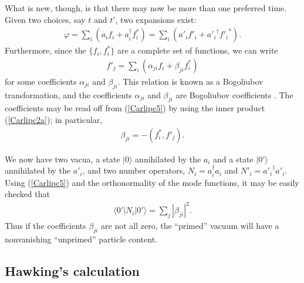\documentclass[11pt]{article}
\begin{document}
What is new, though, is that there may now be more than one preferred time.
Given two choices, say $t$ and $t'$, two expansions exist:
\begin{align}
\varphi = \sum_i \left(a_if_i + a_i^\dagger f_i^*\right)  
  = \sum_i\left(a'_if'_i + {a'_i}^\dagger {f'_i}^*\right)   .
\label{Carlipc4}
\end{align}
Furthermore, since the $\{f_i,f_i^*\}$ are a complete set of functions, we can
write
\begin{align}
f'_j 
  = \sum_i \left(\alpha_{ji}f_i + \beta_{ji}f_i^*\right) 
\label{Carlipc5}
\end{align}
for some coefficients $\alpha_{ji}$ and $\beta_{ji}$.
This relation is known as a Bogoliubov transformation, and 
the coefficients $\alpha_{ji}$ and $\beta_{ji}$ are Bogoliubov 
coefficients \cite{Bogoliubov}.   The coefficients may be
read off from (\ref{Carlipc5}) by using the inner product (\ref{Carlipc2a});
in particular,
\begin{align}
\beta_{ji} = -(f^*_i,f'_j)  .
\label{Carlipc5a}
\end{align}

We now have two vacua, a state $|0\rangle$ annihilated by the 
$a_i$ and a state $|0'\rangle$ annihilated by the $a'_i$, and
two number operators, $N_i=a_i^\dagger a_i$ 
and $N'_i={a'_i}^\dagger a'_i$.  Using (\ref{Carlipc5}) and the 
orthonormality of the mode functions, it may be easily checked that
\begin{align}
\langle 0'| N_i |0'\rangle = \sum_j |\beta_{ji}|^2 .
\label{Carlipc6}
\end{align}
Thus if the coefficients $\beta_{ji}$ are not all zero, the 
``primed'' vacuum will have a nonvanishing ``unprimed'' particle 
content.

\subsection{Hawking's calculation \label{Hawka}}
\end{document}
